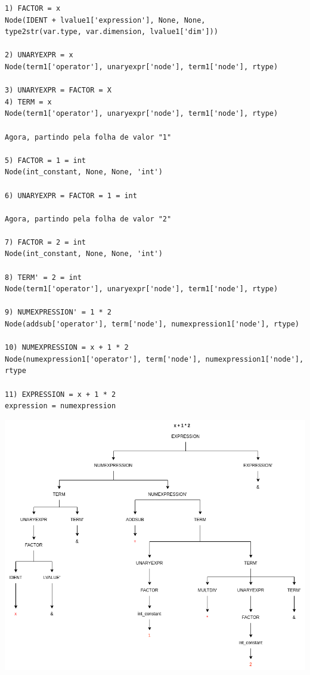 \documentclass[
	12pt,				%
	openright,			%
	twoside,			%
	a4paper,			%
	english,			%
	french,				%
	spanish,			%
	brazil				%
	]{abntex2}
\begin{document}
\begin{lstlisting}
1) FACTOR = x
Node(IDENT + lvalue1['expression'], None, None,
type2str(var.type, var.dimension, lvalue1['dim']))

2) UNARYEXPR = x
Node(term1['operator'], unaryexpr['node'], term1['node'], rtype)

3) UNARYEXPR = FACTOR = X
4) TERM = x
Node(term1['operator'], unaryexpr['node'], term1['node'], rtype) 

Agora, partindo pela folha de valor "1"

5) FACTOR = 1 = int
Node(int_constant, None, None, 'int')

6) UNARYEXPR = FACTOR = 1 = int

Agora, partindo pela folha de valor "2"

7) FACTOR = 2 = int
Node(int_constant, None, None, 'int')

8) TERM' = 2 = int
Node(term1['operator'], unaryexpr['node'], term1['node'], rtype)

9) NUMEXPRESSION' = 1 * 2
Node(addsub['operator'], term['node'], numexpression1['node'], rtype)

10) NUMEXPRESSION = x + 1 * 2
Node(numexpression1['operator'], term['node'], numexpression1['node'], rtype

11) EXPRESSION = x + 1 * 2
expression = numexpression

\end{lstlisting}

\begin{center}
\includegraphics[scale=0.6]{tree.drawio.png}
\end{center}
\end{document}
